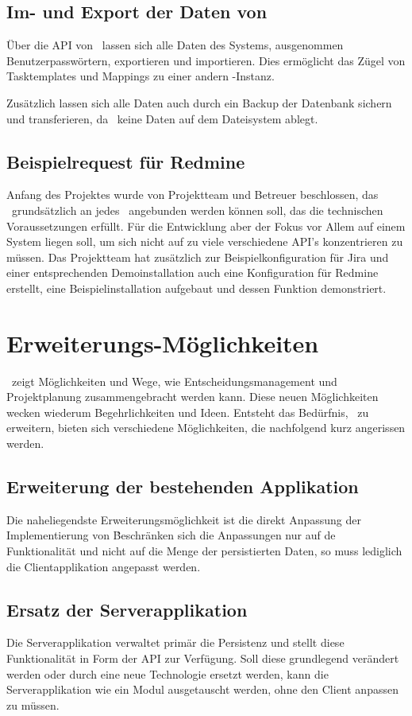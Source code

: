 		
		\subsection{Im- und Export der Daten von \eeppi}
			Über die API von \eeppi\ lassen sich alle Daten des Systems,
			ausgenommen Benutzerpasswörtern, exportieren und importieren.
			Dies ermöglicht das Zügel von Tasktemplates und Mappings zu einer andern \eeppi -Instanz.
			
			Zusätzlich lassen sich alle Daten auch durch ein Backup der Datenbank sichern und transferieren, da \eeppi\ keine Daten auf dem Dateisystem ablegt.
			
			
		\subsection{Beispielrequest für Redmine}
			Anfang des Projektes wurde von Projektteam und Betreuer beschlossen, 
			das \eeppi\ grundsätzlich an jedes \ppt\ angebunden werden können soll, das die technischen Voraussetzungen erfüllt.
			Für die Entwicklung aber der Fokus vor Allem auf einem System liegen soll, um sich nicht auf zu viele verschiedene API's konzentrieren zu müssen.
			Das Projektteam hat zusätzlich zur Beispielkonfiguration für Jira und einer entsprechenden Demoinstallation auch eine Konfiguration für Redmine erstellt, eine Beispielinstallation aufgebaut und dessen Funktion demonstriert.
	
	
	\section{Erweiterungs-Möglichkeiten}
		\eeppi\ zeigt Möglichkeiten und Wege, wie Entscheidungsmanagement und Projektplanung zusammengebracht werden kann.
		Diese neuen Möglichkeiten wecken wiederum Begehrlichkeiten und Ideen.
		Entsteht das Bedürfnis, \eeppi\ zu erweitern, bieten sich verschiedene Möglichkeiten, die nachfolgend kurz angerissen werden.
		

		\subsection{Erweiterung der bestehenden Applikation}
			Die naheliegendste Erweiterungsmöglichkeit ist die direkt Anpassung der Implementierung von \eeppi\.
			Beschränken sich die Anpassungen nur auf de Funktionalität und nicht auf die Menge der persistierten Daten, so muss lediglich die Clientapplikation angepasst werden.
	
		\subsection{Ersatz der Serverapplikation}
			Die Serverapplikation verwaltet primär die Persistenz und stellt diese Funktionalität in Form der API zur Verfügung.
			Soll diese grundlegend verändert werden oder durch eine neue Technologie ersetzt werden,
			kann die Serverapplikation wie ein Modul ausgetauscht werden, ohne den Client anpassen zu müssen.
			
